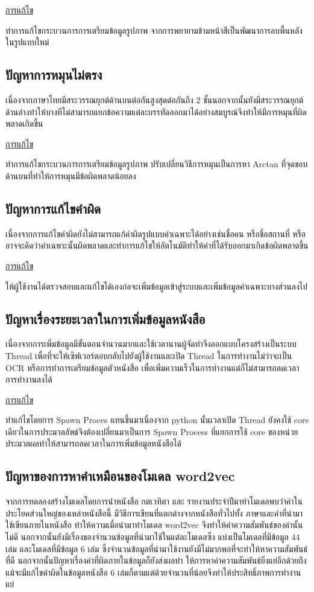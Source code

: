 \underline{การแก้ไข}

	ทำการแก้ไขกระบวนการการเตรียมข้อมูลรูปภาพ จากการพยายามข้ามหน้าสีเป็นพัฒนาการลบพื้นหลังในรูปแบบใหม่
\subsection{ปัญหาการหมุนไม่ตรง}
เนื่องจากภาษาไทยมีสระวรรณยุกต์ด้านบนต่อกันสูงสุดต่อกันถึง 2 ชั้นนอกจากนั้นยังมีสระวรรณยุกต์ด้านล่างทำให้บางทีไม่สามารถแยกข้อความแต่ละบรรทัดออกมาได้อย่างสมบูรณ์จึงทำให้มีการหมุนที่ผิดพลาดเกิดขึ้น

\underline{การแก้ไข}

	ทำการแก้ไขกระบวนการการเตรียมข้อมูลรูปภาพ ปรับเปลี่ยนวิธีการหมุนเป็นการหา Arctan ที่จุดขอบด้านบนที่ทำให้การหมุนมีข้อผิดพลาดน้อยลง
\subsection{ปัญหาการแก้ไขคำผิด}
เนื่องจากการแก้ไขคำผิดยังไม่สามารถแก้คำผิดรูปแบบคำเฉพาะได้อย่างเช่นชื่อคน หรือชื่อสถานที่ หรืออาจจะคิดว่าคำเฉพาะนั้นผิดพลาดและทำการแก้ไขให้อัตโนมัติทำให้คำที่ได้รับออกมาเกิดข้อผิดพลาดขึ้น

\underline{การแก้ไข}

	ให้ผู้ใช้งานได้ตรวจสอบและแก้ไขได้เองก่อจะเพิ่มข้อมูลเข้าสู่ระบบและเพิ่มข้อมูลคำเฉพาะบางส่วนลงไป
\subsection{ปัญหาเรื่องระยะเวลาในการเพิ่มข้อมูลหนังสือ}
เนื่องจากการเพิ่มข้อมูลมีขั้นตอนจำนวนมากและใช้เวลานานผู้จัดทำจึงออกแบบโครงสร้างเป็นระบบ Thread เพื่อที่จะให้เซิฟเวอร์ตอบกลับไปยังผู้ใช้งานและเปิด Thread ในการทำงานไม่ว่าจะเป็น OCR หรือการทำการเตรียมข้อมูลตัวหนังสือ เพื่อเพิ่มความเร็วในการทำงานแต่ก็ไม่สามารถลดเวลาการทำงานลงได้

\underline{การแก้ไข}

	ทำแก้ไขโดยการ Spawn Proces แทนขึ้นมาเนื่องจาก python นั้นเวลาเปิด Thread ยังคงใช้ core เดียวในการประมวลลัพธ์จึงต้องเปลี่ยนมาเป็นการ Spawn Process ที่แยกการใช้ core ของหน่วยประมวลผลทำให้สามารถลดเวลาในการเพิ่มข้อมูลหนังสือได้

\subsection{ปัญหาของการหาคำเหมือนของโมเดล word2vec}

	จากการทดลองสร้างโมเดลโดยการนำหนังสือ กตเวทิตา และ รายงานประจำปีมาทำโมเดลพบว่าคำในประโยคส่วนใหญ่ของเหล่าหนังสือนี้ มีวิธีการเขียนที่แตกต่างจากหนังสือทั่วไปทั้ง 
	ภาษาและคำที่นำมาใช้เขียนภายในหนังสือ ทำให้ความเมื่อนำมาทำโมเดล word2vec จึงทำให้ค่าความสัมพันธ์ของคำนั้นไม่ดี นอกจากนั้นยังมีเรื่องของจำนวนข้อมูลที่นำมาใช้ในแต่ละโมเดลซึ่ง 
	แบ่งเป็นโมเดลที่มีข้อมูล 44 เล่ม และโมเดลที่มีข้อมูล 6 เล่ม ซึ่งจำนวนข้อมูลที่นำมาใช้งานยังมีไม่มากพอที่จะทำให้หาความสัมพันธ์ที่ดี นอกจากนั้นปัญหาเรี่องคำที่ผิดภายในข้อมูลก็ยังส่งผลทำ
	ให้การหาค่าความสัมพันธ์ยิ่งแย่อีกด้วยถึงแม้จะมีแก้ไขคำผิดในข้อมูลหนังสือ 6 เล่มก็ตามแต่ด้วยจำนวนที่น้อยจึงทำให้ประสิทธิ์ภาพการทำงานแย่

